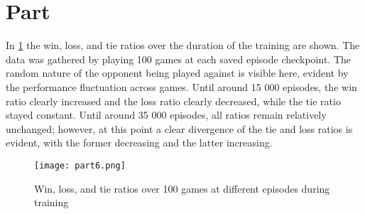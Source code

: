 \documentclass{article}
\newcommand{\enterproblemHeader}[1]{
}
\newcommand{\exitproblemHeader}[1]{
}
\newcounter{problem} %
\newcommand{\problemName}{}
\newenvironment{problem}[1][Part \theproblem]{ %
	\stepcounter{problem} %
	\renewcommand{\problemName}{#1} %
	\section{\problemName} %
	\enterproblemHeader{\problemName} %
}{
	\exitproblemHeader{\problemName} %
}
\begin{document}
\FloatBarrier
\begin{problem}
    In \cref{fig:p6} the win, loss, and tie ratios over the duration of the training are shown. The data was gathered by playing 100 games at each saved episode checkpoint. The random nature of the opponent being played against is visible here, evident by the performance fluctuation across games. Until around 15 000 episodes, the win ratio clearly increased and the loss ratio clearly decreased, while the tie ratio stayed constant. Until around 35 000 episodes, all ratios remain relatively unchanged; however, at this point a clear divergence of the tie and loss ratios is evident, with the former decreasing and the latter increasing.

    \begin{figure}
    \texttt{[image: part6.png]}
    \caption{Win, loss, and tie ratios over 100 games at different episodes during training}
    \label{fig:p6}
    \end{figure}
    	
\end{problem}
\clearpage
\end{document}
